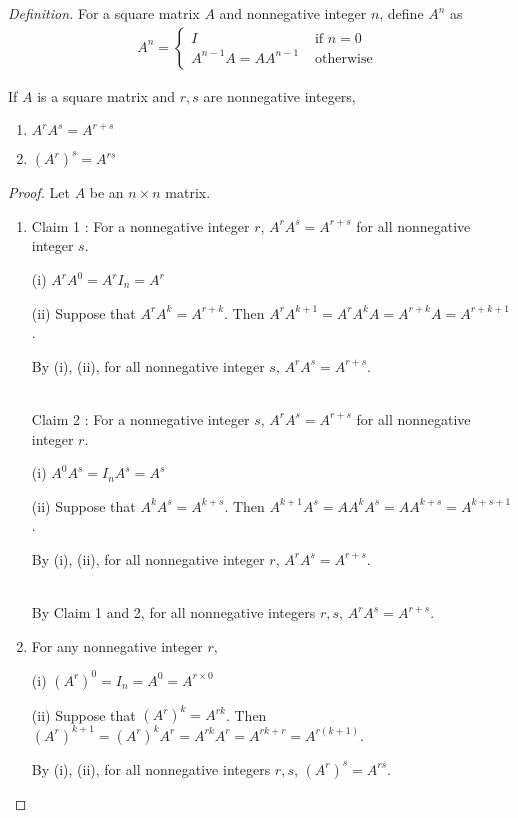 \noindent \textit{Definition.} For a square matrix $A$ and nonnegative integer $n$, define $A^n$ as
\begin{align*}
A^n = \begin{cases}
I &\mbox{ if } n = 0 \\
A^{n-1}A = AA^{n-1} &\mbox{ otherwise }
\end{cases}
\end{align*} 

\begin{plaintheorem}
	If $A$ is a square matrix and $r, s$ are nonnegative integers,
	\begin{enumerate}
		\item $A^rA^s = A^{r+s}$
		\item $(A^r)^s = A^{rs}$
	\end{enumerate}
\end{plaintheorem}


\begin{proof}
	Let $A$ be an $n \times n$ matrix.
	
	\begin{enumerate}
		\item Claim 1 : For a nonnegative integer $r$, $A^rA^s = A^{r+s}$ for all nonnegative integer $s$.
		
		\noindent (i) $A^rA^0 = A^rI_n = A^r$
		
		\noindent (ii) Suppose that $A^rA^k = A^{r+k}$. Then $A^rA^{k+1} = A^rA^kA = A^{r+k}A = A^{r+k+1}$.
		
		\noindent By (i), (ii), for all nonnegative integer $s$, $A^rA^s = A^{r+s}$.
		
		\noindent \\ Claim 2 : For a nonnegative integer $s$, $A^rA^s = A^{r+s}$ for all nonnegative integer $r$.
		
		\noindent (i) $A^0A^s = I_nA^s = A^s$
		
		\noindent (ii) Suppose that $A^kA^s = A^{k+s}$. Then $A^{k+1}A^s = AA^kA^s = AA^{k+s} = A^{k+s+1}$.
		
		\noindent By (i), (ii), for all nonnegative integer $r$, $A^rA^s = A^{r+s}$.
		
		\noindent \\ By Claim 1 and 2, for all nonnegative integers $r, s$, $A^rA^s = A^{r+s}$.
		
		\item For any nonnegative integer $r$,
		
		\noindent (i) $(A^r)^0 = I_n = A^{0} = A^{r\times0}$
		
		\noindent (ii) Suppose that $(A^r)^k = A^{rk}$. Then $(A^r)^{k+1} = (A^r)^kA^r = A^{rk}A^r = A^{rk+r} = A^{r(k+1)}$.
		
		\noindent By (i), (ii), for all nonnegative integers $r, s$, $(A^r)^s = A^{rs}$.
	\end{enumerate}
\end{proof}

